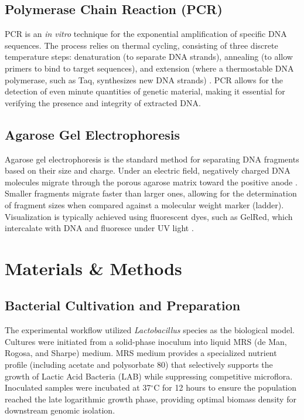 \documentclass[a4paper]{article}
\begin{document}
\subsection{Polymerase Chain Reaction (PCR)}
PCR is an \textit{in vitro} technique for the exponential amplification of specific DNA sequences. The process relies on thermal cycling, consisting of three discrete temperature steps: denaturation (to separate DNA strands), annealing (to allow primers to bind to target sequences), and extension (where a thermostable DNA polymerase, such as Taq, synthesizes new DNA strands) \cite{3}. PCR allows for the detection of even minute quantities of genetic material, making it essential for verifying the presence and integrity of extracted DNA.

\subsection{Agarose Gel Electrophoresis}
Agarose gel electrophoresis is the standard method for separating DNA fragments based on their size and charge. Under an electric field, negatively charged DNA molecules migrate through the porous agarose matrix toward the positive anode \cite{4}. Smaller fragments migrate faster than larger ones, allowing for the determination of fragment sizes when compared against a molecular weight marker (ladder). Visualization is typically achieved using fluorescent dyes, such as GelRed, which intercalate with DNA and fluoresce under UV light \cite{4}.

\section{Materials \& Methods}

\subsection{Bacterial Cultivation and Preparation}
The experimental workflow utilized \textit{Lactobacillus} species as the biological model. Cultures were initiated from a solid-phase inoculum into liquid MRS (de Man, Rogosa, and Sharpe) medium. MRS medium provides a specialized nutrient profile (including acetate and polysorbate 80) that selectively supports the growth of Lactic Acid Bacteria (LAB) while suppressing competitive microflora. Inoculated samples were incubated at 37$^\circ$C for 12 hours to ensure the population reached the late logarithmic growth phase, providing optimal biomass density for downstream genomic isolation.
\end{document}
